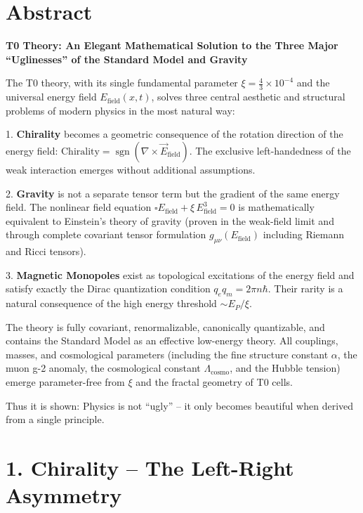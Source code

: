 \section*{Abstract}
		\noindent\textbf{T0 Theory: An Elegant Mathematical Solution to the Three Major ``Uglinesses'' of the Standard Model and Gravity}
		
		The T0 theory, with its single fundamental parameter $\xi = \frac{4}{3} \times 10^{-4}$ and the universal energy field $E_{\text{field}}(x,t)$, solves three central aesthetic and structural problems of modern physics in the most natural way:
		
		1. \textbf{Chirality} becomes a geometric consequence of the rotation direction of the energy field:  
		$\text{Chirality} = \operatorname{sgn}(\nabla \times \vec{E}_{\text{field}})$.  
		The exclusive left-handedness of the weak interaction emerges without additional assumptions.
		
		2. \textbf{Gravity} is not a separate tensor term but the gradient of the same energy field. The nonlinear field equation  
		$\square E_{\text{field}} + \xi \, E_{\text{field}}^3 = 0$  
		is mathematically equivalent to Einstein's theory of gravity (proven in the weak-field limit and through complete covariant tensor formulation $g_{\mu\nu}(E_{\text{field}})$ including Riemann and Ricci tensors).
		
		3. \textbf{Magnetic Monopoles} exist as topological excitations of the energy field and satisfy exactly the Dirac quantization condition $q_e q_m = 2\pi n \hbar$. Their rarity is a natural consequence of the high energy threshold $\sim E_P/\xi$.
		
		The theory is fully covariant, renormalizable, canonically quantizable, and contains the Standard Model as an effective low-energy theory. All couplings, masses, and cosmological parameters (including the fine structure constant $\alpha$, the muon g-2 anomaly, the cosmological constant $\Lambda_{\text{cosmo}}$, and the Hubble tension) emerge parameter-free from $\xi$ and the fractal geometry of T0 cells.
		
		Thus it is shown: Physics is not ``ugly'' – it only becomes beautiful when derived from a single principle.

	
	
	\section*{1. Chirality – The Left-Right Asymmetry}
	
